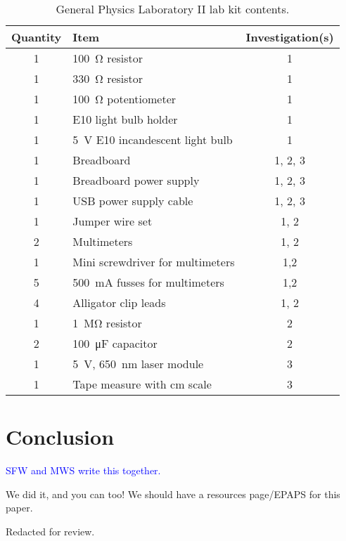 \documentclass[aip, numerical, preprint]{revtex4-2}
\begin{document}
\begin{table}
  \caption{\label{tab: 1261 lab kit} General Physics Laboratory II lab kit contents.}
  \begin{tabular}{clc}
    \hline\hline
    Quantity & Item & Investigation(s)\\
    \hline
    1 & \SI{100}{\ohm} resistor & 1 \\
    1 & \SI{330}{\ohm} resistor & 1 \\
    1 &  \SI{100}{\ohm} potentiometer & 1 \\
    1 & E10 light bulb holder & 1 \\
    1 & \SI{5}{V} E10 incandescent light bulb & 1 \\
    1 & Breadboard & 1, 2, 3 \\
    1 & Breadboard power supply & 1, 2, 3 \\
    1 & USB power supply cable & 1, 2, 3 \\
    1 & Jumper wire set & 1, 2 \\
    2 & Multimeters & 1, 2 \\
    1 & Mini screwdriver for multimeters & 1,2 \\
    5 & \SI{500}{mA} fusses for multimeters & 1,2 \\
    4 & Alligator clip leads & 1, 2 \\
    1 & \SI{1}{\mega\ohm} resistor & 2 \\
    2 & \SI{100}{\micro\farad} capacitor & 2 \\
    1 & \SI{5}{V}, \SI{650}{nm} laser module & 3 \\
    1 & Tape measure with cm scale & 3 \\            
    \hline\hline
  \end{tabular}
\end{table}


\section{Conclusion}
\textcolor{blue}{SFW and MWS write this together.}

We did it, and you can too!  We should have a resources page/EPAPS for this paper.

\begin{acknowledgments}
  Redacted for review.%
\end{acknowledgments}


\end{document}
